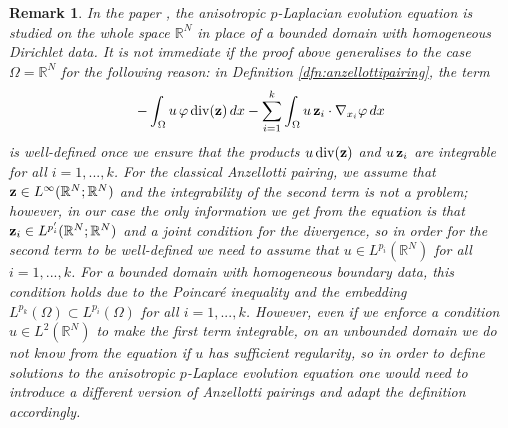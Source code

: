 \documentclass[reqno,12pt]{amsart}
\def\z{{\bf z}}
\newtheorem{remark}[theorem]{Remark}
\numberwithin{equation}{section}
\begin{document}
\begin{remark}
In the paper \cite{FVV}, the anisotropic $p$-Laplacian evolution equation is studied on the whole space $\mathbb{R}^N$ in place of a bounded domain with homogeneous Dirichlet data. It is not immediate if the proof above generalises to the case $\Omega = \mathbb{R}^N$ for the following reason: in Definition \ref{dfn:anzellottipairing}, the term
\begin{equation}
-\int_\Omega u \, \varphi \, \mathrm{div}(\z) \, dx - \sum_{i = 1}^k \int_\Omega u \, \z_i \cdot \nabla_{x_i} \varphi \, dx
\end{equation}
is well-defined once we ensure that the products $u \, \mathrm{div}(\z)$ and $u \, \z_i$ are integrable for all $i = 1, ..., k$. For the classical Anzellotti pairing, we assume that $\z \in L^\infty(\mathbb{R}^N; \mathbb{R}^N)$ and the integrability of the second term is not a problem; however, in our case the only information we get from the equation is that $\z_i \in L^{p'_i}(\mathbb{R}^N; \mathbb{R}^N)$ and a joint condition for the divergence, so in order for the second term to be well-defined we need to assume that $u \in L^{p_i}(\mathbb{R}^N)$ for all $i = 1,...,k$. For a bounded domain with homogeneous boundary data, this condition holds due to the Poincar\'e inequality and the embedding $L^{p_k}(\Omega) \subset L^{p_i}(\Omega)$ for all $i = 1,...,k$. However, even if we enforce a condition $u \in L^2(\mathbb{R}^N)$ to make the first term integrable, on an unbounded domain we do not know from the equation if $u$ has sufficient regularity, so in order to define solutions to the anisotropic $p$-Laplace evolution equation one would need to introduce a different version of Anzellotti pairings and adapt the definition accordingly.
\end{remark}
\end{document}
